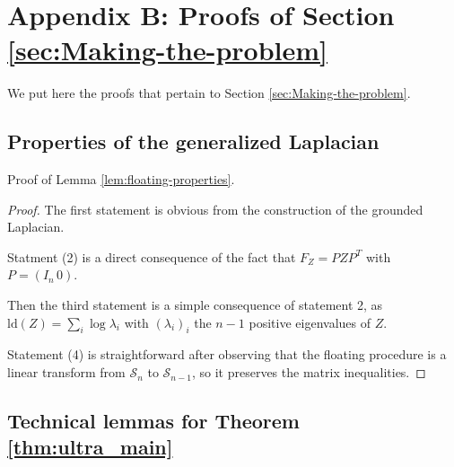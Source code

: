 
\section*{Appendix B: Proofs of Section \ref{sec:Making-the-problem}}

We put here the proofs that pertain to Section \ref{sec:Making-the-problem}.


\subsection{Properties of the generalized Laplacian}

Proof of Lemma \ref{lem:floating-properties}.
\begin{proof}
The first statement is obvious from the construction of the grounded
Laplacian.

Statment (2) is a direct consequence of the fact that $F_{Z}=PZP^{T}$
with $P=\left(I_{n}\,0\right)$.

Then the third statement is a simple consequence of statement 2, as
$\text{ld}\left(Z\right)=\sum_{i}\log\lambda_{i}$ with $\left(\lambda_{i}\right)_{i}$
the $n-1$ positive eigenvalues of $Z$.

Statement (4) is straightforward after observing that the floating
procedure is a linear transform from $\mathcal{S}_{n}$ to $\mathcal{S}_{n-1}$,
so it preserves the matrix inequalities.
\end{proof}

\subsection{Technical lemmas for Theorem \ref{thm:ultra_main}}

